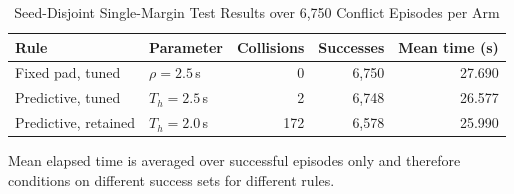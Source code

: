 \begin{table}[htbp]
  \centering
  \caption{Seed-Disjoint Single-Margin Test Results over 6,750 Conflict
  Episodes per Arm}
  \label{tab:single-margin}
  \footnotesize
  \setlength{\tabcolsep}{3.5pt}
  \begin{tabular}{@{}llrrr@{}}
    \toprule
    Rule & Parameter & Collisions & Successes & Mean time (s) \\
    \midrule
    Fixed pad, tuned & $\rho=2.5$\,s & 0 & 6,750 & 27.690 \\
    Predictive, tuned & $T_h=2.5$\,s & 2 & 6,748 & 26.577 \\
    Predictive, retained & $T_h=2.0$\,s & 172 & 6,578 & 25.990 \\
    \bottomrule
  \end{tabular}

  \vspace{3pt}
  \parbox{\columnwidth}{\footnotesize Mean elapsed time is averaged over
  successful episodes only and therefore conditions on different success sets
  for different rules.}
\end{table}
